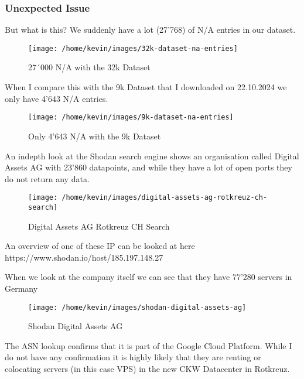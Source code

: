 \documentclass[11pt,a4paper]{article}
\begin{document}
\begin{data}
\newpage
\subsubsection{Unexpected Issue}
But what is this? We suddenly have a lot  (27'768) of N/A entries in our dataset.

\begin{figure}[h!]
    \centering
    \texttt{[image: /home/kevin/images/32k-dataset-na-entries]}
    \caption{27´000 N/A with the 32k Dataset}
    \label{fig:32k-dataset-na-entries}
\end{figure}

When I compare this with the 9k Dataset that I downloaded on 22.10.2024 we only have 4'643 N/A entries.

\begin{figure}[h!]
    \centering
    \texttt{[image: /home/kevin/images/9k-dataset-na-entries]}
    \caption{Only 4'643 N/A with the 9k Dataset}
    \label{fig:9k-dataset-na-entries}
\end{figure}

\newpage

An indepth look at the Shodan search engine shows an organisation called Digital Assets AG with 23'860 datapoints, and
while they have a lot of open ports they do not return any data.

\begin{figure}[h!]
    \centering
    \texttt{[image: /home/kevin/images/digital-assets-ag-rotkreuz-ch-search]}
    \caption{Digital Assets AG Rotkreuz CH Search}
    \label{fig:digital-assets-ag-rotkreuz-ch-search}
\end{figure}

An overview of one of these IP can be looked at here https://www.shodan.io/host/185.197.148.27


When we look at the company itself we can see that they have 77'280 servers in Germany

\begin{figure}[h!]
    \centering
    \texttt{[image: /home/kevin/images/shodan-digital-assets-ag]}
    \caption{Shodan Digital Assets AG}
    \label{fig:shodan-digital-assets-ag}
\end{figure}

The ASN lookup confirms that it is part of the Google Cloud Platform. While I do not have any confirmation it is highly likely that
they are renting or colocating servers (in this case VPS) in the new CKW Datacenter in Rotkreuz.


\end{data}
\end{document}
